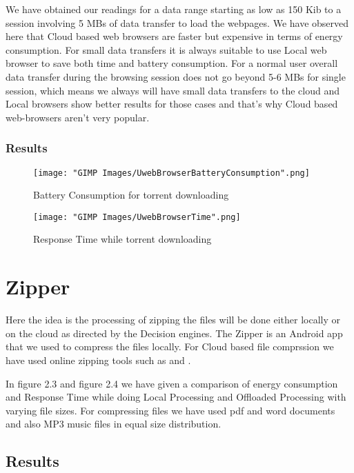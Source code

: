 \documentclass{report}
\begin{document}
We have obtained our readings for a data range starting as low as 150 Kib to a session involving 5 MBs of data transfer to load the webpages. We have observed here that Cloud based web browsers are faster but expensive in terms of energy consumption. For small data transfers it is always suitable to use Local web browser to save both time and battery consumption. For a normal user overall data transfer during the browsing session does not go beyond 5-6 MBs for single session, which means we always will have small data transfers to the cloud and Local browsers show better results for those cases and that's why Cloud based web-browsers aren't very popular.

\subsection{Results}
\begin{figure}[h]
  \centering
  \texttt{[image: "GIMP Images/UwebBrowserBatteryConsumption".png]}
  \caption{Battery Consumption for torrent downloading}
  \label{fig:UwebBrowserBatteryConsumption}
\end{figure}

\begin{figure}[h]
  \centering
  \texttt{[image: "GIMP Images/UwebBrowserTime".png]}
  \caption{Response Time while torrent downloading}
  \label{fig:UwebBrowserTime}
\end{figure}


\chapter{Zipper} %
Here the idea is the processing of zipping the files will be done either locally or on the cloud as directed by the Decision engines. 
The Zipper is an Android app that we used to compress the files locally. For Cloud based file comprssion we have used online zipping tools such as \cite{ezyZip} and \cite{olconvert}.

In figure 2.3 and figure 2.4 we have given a comparison of energy consumption and
Response Time while doing Local Processing and Offloaded Processing with varying file sizes. For compressing files we have used pdf and word documents and also MP3 music files in equal size distribution.

\section{Results}
\end{document}
